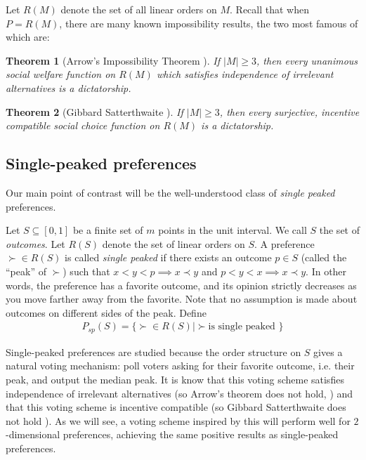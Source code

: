 \documentclass[12pt]{article}
\newtheorem{theorem}{Theorem}
\newcommand{\1}[1]{\mathds{1}[{#1}]}
\begin{document}
    Let $R(M)$ denote the set of all linear orders on $M$.
    Recall that when $P = R(M)$, there are many known impossibility results,
    the two most famous of which are:

    \begin{theorem}[Arrow's Impossibility Theorem \cite{AgtBookMechDesignInto}]
      If $|M| \ge 3$, then
      every unanimous social welfare function on $R(M)$
      which satisfies independence of irrelevant alternatives is a dictatorship.
    \end{theorem}

    \begin{theorem}[Gibbard Satterthwaite \cite{AgtBookMechDesignInto}]
      If $|M| \ge 3$, then
      every surjective, incentive compatible social choice function on $R(M)$
      is a dictatorship.
    \end{theorem}

  \subsection{Single-peaked preferences}
    Our main point of contrast will be the well-understood class of
    \emph{single peaked} preferences.

    Let $S\subseteq [0,1]$ be a finite set of $m$ points in the unit interval.
    We call $S$ the set of \emph{outcomes}.
    Let $R(S)$ denote the set of linear orders on $S$.
    A preference $\succ \in R(S)$ is called \emph{single peaked} if
    there exists an outcome $p\in S$ (called the ``peak'' of $\succ$)
    such that $x < y < p \implies x \prec y$ and $p < y < x \implies x \prec y$.
    In other words, the preference has a favorite outcome,
    and its opinion strictly decreases as you move farther away from the favorite.
    Note that no assumption is made about outcomes on different sides of the peak.
    Define
    \begin{align*}
      P_{sp}(S) = \{ \succ \in R(S) | \succ \text{is single peaked }\}
    \end{align*}

    Single-peaked preferences are studied because the order structure on $S$
    gives a natural voting mechanism: poll voters asking for their favorite
    outcome, i.e. their peak, and output the median peak.
    It is know that this voting scheme satisfies independence of irrelevant
    alternatives (so Arrow's theorem does not hold,
    \cite{AgtBookMechDesignInto}) and that this voting scheme is incentive
    compatible (so Gibbard Satterthwaite does not hold \cite{AgtBookNoMoney}).
    As we will see, a voting scheme inspired by this will perform well for
    $2$-dimensional preferences, achieving the same positive results as
    single-peaked preferences.
\end{document}
